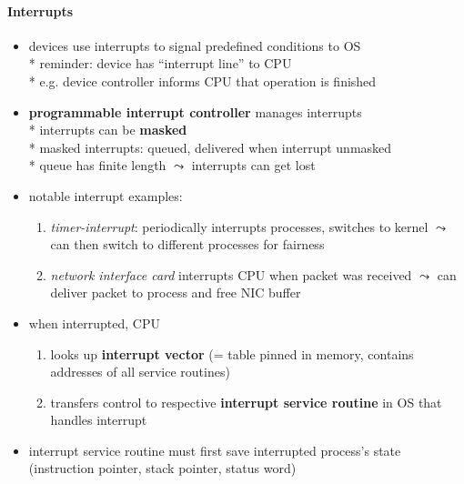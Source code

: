 \paragraph{Interrupts}
\begin{itemize}
	\item devices use interrupts to signal predefined conditions to OS \\*
		reminder: device has "`interrupt line"' to CPU \\*
		e.g. device controller informs CPU that operation is finished
	\item \textbf{programmable interrupt controller} manages interrupts \\*
		interrupts can be \textbf{masked} \\*
		masked interrupts: queued, delivered when interrupt unmasked \\*
		queue has finite length \( \leadsto \) interrupts can get lost
	\item notable interrupt examples:
	\begin{enumerate}
		\item \emph{timer-interrupt}: periodically interrupts processes, switches to kernel \( \leadsto \) can then switch to different processes for fairness
		\item \emph{network interface card} interrupts CPU when packet was received \( \leadsto \) can deliver packet to process and free NIC buffer
	\end{enumerate}
	\item when interrupted, CPU
	\begin{enumerate}
		\item looks up \textbf{interrupt vector} (= table pinned in memory, contains addresses of all service routines)
		\item transfers control to respective \textbf{interrupt service routine} in OS that handles interrupt
	\end{enumerate}
	\item interrupt service routine must first save interrupted process's state (instruction pointer, stack pointer, status word)
\end{itemize}

